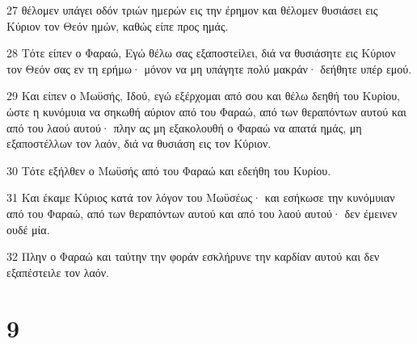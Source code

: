 \par 27 θέλομεν υπάγει οδόν τριών ημερών εις την έρημον και θέλομεν θυσιάσει εις Κύριον τον Θεόν ημών, καθώς είπε προς ημάς.
\par 28 Τότε είπεν ο Φαραώ, Εγώ θέλω σας εξαποστείλει, διά να θυσιάσητε εις Κύριον τον Θεόν σας εν τη ερήμω· μόνον να μη υπάγητε πολύ μακράν· δεήθητε υπέρ εμού.
\par 29 Και είπεν ο Μωϋσής, Ιδού, εγώ εξέρχομαι από σου και θέλω δεηθή του Κυρίου, ώστε η κυνόμυια να σηκωθή αύριον από του Φαραώ, από των θεραπόντων αυτού και από του λαού αυτού· πλην ας μη εξακολουθή ο Φαραώ να απατά ημάς, μη εξαποστέλλων τον λαόν, διά να θυσιάση εις τον Κύριον.
\par 30 Τότε εξήλθεν ο Μωϋσής από του Φαραώ και εδεήθη του Κυρίου.
\par 31 Και έκαμε Κύριος κατά τον λόγον του Μωϋσέως· και εσήκωσε την κυνόμυιαν από του Φαραώ, από των θεραπόντων αυτού και από του λαού αυτού· δεν έμεινεν ουδέ μία.
\par 32 Πλην ο Φαραώ και ταύτην την φοράν εσκλήρυνε την καρδίαν αυτού και δεν εξαπέστειλε τον λαόν.

\chapter{9}

